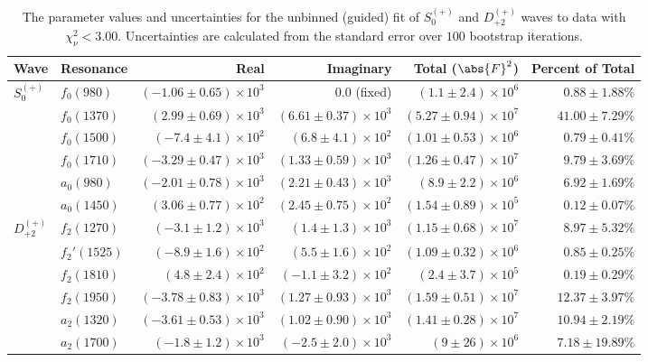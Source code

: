\begin{table}[ht]
    \begin{center}
        \begin{tabular}{llrrrr}\toprule
        Wave & Resonance & Real & Imaginary & Total ($\abs{F}^2$) & Percent of Total \\\midrule
$S_{0}^{(+)}$ & $f_{0}(980)$ & $(-1.06 \pm 0.65) \times 10^{3}$ & $0.0$ (fixed) & $(1.1 \pm 2.4) \times 10^{6}$ & $0.88 \pm 1.88 \%$ \\
 & $f_{0}(1370)$ & $(2.99 \pm 0.69) \times 10^{3}$ & $(6.61 \pm 0.37) \times 10^{3}$ & $(5.27 \pm 0.94) \times 10^{7}$ & $41.00 \pm 7.29 \%$ \\
 & $f_{0}(1500)$ & $(-7.4 \pm 4.1) \times 10^{2}$ & $(6.8 \pm 4.1) \times 10^{2}$ & $(1.01 \pm 0.53) \times 10^{6}$ & $0.79 \pm 0.41 \%$ \\
 & $f_{0}(1710)$ & $(-3.29 \pm 0.47) \times 10^{3}$ & $(1.33 \pm 0.59) \times 10^{3}$ & $(1.26 \pm 0.47) \times 10^{7}$ & $9.79 \pm 3.69 \%$ \\
 & $a_{0}(980)$ & $(-2.01 \pm 0.78) \times 10^{3}$ & $(2.21 \pm 0.43) \times 10^{3}$ & $(8.9 \pm 2.2) \times 10^{6}$ & $6.92 \pm 1.69 \%$ \\
 & $a_{0}(1450)$ & $(3.06 \pm 0.77) \times 10^{2}$ & $(2.45 \pm 0.75) \times 10^{2}$ & $(1.54 \pm 0.89) \times 10^{5}$ & $0.12 \pm 0.07 \%$ \\
$D_{+2}^{(+)}$ & $f_{2}(1270)$ & $(-3.1 \pm 1.2) \times 10^{3}$ & $(1.4 \pm 1.3) \times 10^{3}$ & $(1.15 \pm 0.68) \times 10^{7}$ & $8.97 \pm 5.32 \%$ \\
 & $f_{2}'(1525)$ & $(-8.9 \pm 1.6) \times 10^{2}$ & $(5.5 \pm 1.6) \times 10^{2}$ & $(1.09 \pm 0.32) \times 10^{6}$ & $0.85 \pm 0.25 \%$ \\
 & $f_{2}(1810)$ & $(4.8 \pm 2.4) \times 10^{2}$ & $(-1.1 \pm 3.2) \times 10^{2}$ & $(2.4 \pm 3.7) \times 10^{5}$ & $0.19 \pm 0.29 \%$ \\
 & $f_{2}(1950)$ & $(-3.78 \pm 0.83) \times 10^{3}$ & $(1.27 \pm 0.93) \times 10^{3}$ & $(1.59 \pm 0.51) \times 10^{7}$ & $12.37 \pm 3.97 \%$ \\
 & $a_{2}(1320)$ & $(-3.61 \pm 0.53) \times 10^{3}$ & $(1.02 \pm 0.90) \times 10^{3}$ & $(1.41 \pm 0.28) \times 10^{7}$ & $10.94 \pm 2.19 \%$ \\
 & $a_{2}(1700)$ & $(-1.8 \pm 1.2) \times 10^{3}$ & $(-2.5 \pm 2.0) \times 10^{3}$ & $(9 \pm 26) \times 10^{6}$ & $7.18 \pm 19.89 \%$ \\\bottomrule
        \end{tabular}
    \caption{The parameter values and uncertainties for the unbinned (guided) fit of $S_{0}^{(+)}$ and $D_{+2}^{(+)}$ waves to data with $\chi^2_\nu < 3.00$. Uncertainties are calculated from the standard error over $100$ bootstrap iterations.}\label{tab:unbinned-fit-chisqdof-3.0-guided-Sp0p-Dp2p}
    \end{center}
\end{table}
